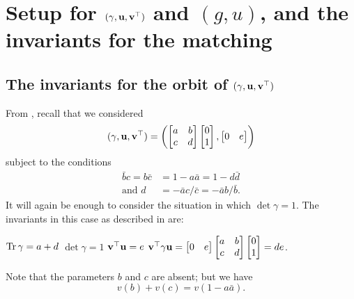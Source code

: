 \section{Setup for ${(\gamma, \mathbf u, \mathbf v^\top)}$ and $(g,u)$, and the invariants for the matching}
\subsection{The invariants for the orbit of ${(\gamma, \mathbf u, \mathbf v^\top)}$}
From , recall that we considered
\[
  (\gamma, \mathbf u, \mathbf v^\top)
  =
  \left( \begin{bmatrix} a & b \\ c & d \end{bmatrix}
    \begin{bmatrix} 0 \\ 1 \end{bmatrix}, \begin{bmatrix} 0 & e \end{bmatrix} \right)
\]
subject to the conditions
\begin{align*}
  \bar b c = b \bar c &= 1 - a \bar a = 1 - d \bar d \\
  \text{and } d &= - \bar a c / \bar c = -\bar a b / \bar b.
\end{align*}
It will again be enough to consider the situation in which $\det \gamma = 1$.
The invariants in this case as described in  are:
\begin{itemize}
  \ii $\operatorname{Tr} \gamma = a + d$
  \ii $\det \gamma = 1$
  \ii $\mathbf v^\top \mathbf u = e$
  \ii $\mathbf v^\top \gamma \mathbf u = \begin{bmatrix} 0 & e \end{bmatrix}
  \begin{bmatrix} a & b \\ c & d \end{bmatrix} \begin{bmatrix} 0 \\ 1 \end{bmatrix} = de$.
\end{itemize}
Note that the parameters $b$ and $c$ are absent; but we have
\[ v(b) + v(c) = v(1 - a \bar a). \]


